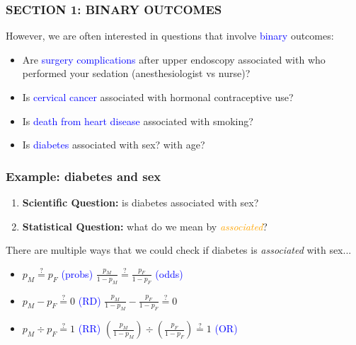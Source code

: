 \documentclass[12pt, 
hyperref={colorlinks=true, linkcolor=blue, urlcolor=cyan}]{beamer}
\begin{document}
\begin{frame}
\frametitle{SECTION 1: BINARY OUTCOMES}
However, we are often interested in questions that involve \textcolor{blue}{binary} outcomes:

\begin{itemize}
\item Are \textcolor{blue}{surgery complications} after upper endoscopy associated with who performed your sedation (anesthesiologist vs nurse)? %
\item Is \textcolor{blue}{cervical cancer} associated with hormonal contraceptive use? %
\item Is \textcolor{blue}{death from heart disease} associated with smoking?
\item Is \textcolor{blue}{diabetes} associated with sex? with age? %
\end{itemize}
\end{frame}

\begin{frame}
\frametitle{Example: diabetes and sex}

\begin{enumerate}
\item \textbf{Scientific Question:} is diabetes associated with sex?  \pause
\item \textbf{Statistical Question:} what do we mean by \textcolor{orange}{\textit{associated}}?  \pause
\end{enumerate}

There are multiple ways that we could check if diabetes is \textit{associated} with sex... \pause
\begin{itemize}
\item[] $p_M \stackrel{?}{=} p_F$ \textcolor{blue}{(probs)} \quad \quad \quad \quad \pause $\frac{p_M}{1-p_M} \stackrel{?}{=} \frac{p_F}{1-p_F}$ \pause \textcolor{blue}{(odds)} \pause
\item[] $p_M - p_F \stackrel{?}{=} 0$ \pause \textcolor{blue}{(RD)} \pause \quad \quad \quad $\frac{p_M}{1-p_M} - \frac{p_F}{1-p_F} \stackrel{?}{=} 0$ \pause
\item[] $p_M \div p_F \stackrel{?}{=} 1$ \pause \textcolor{blue}{(RR)} \pause \quad \quad \quad  $\left(\frac{p_M}{1-p_M}\right) \div \left(\frac{p_F}{1-p_F}\right) \stackrel{?}{=} 1$ \pause \textcolor{blue}{(OR)}
\end{itemize}
\end{frame}
\end{document}
